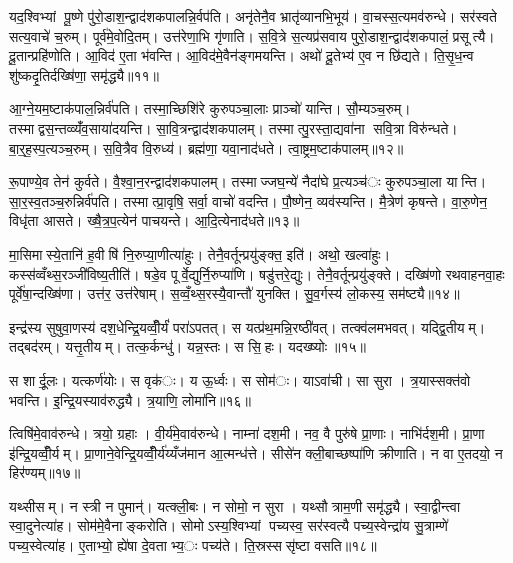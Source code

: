 यद॒श्विभ्यां पू॒ष्णे पु॑रो॒डाश॒न्द्वाद॑शकपालन्नि॒र्वप॑ति। अनृ॑तेनै॒व भ्रातृ॑व्यानभि॒भूय॑। वा॒चस्स॒त्यमव॑रुन्धे। सर॑स्वते सत्य॒वाचे॑ च॒रुम्। पूर्व॑मे॒वोदि॒तम्। उत्त॑रेणा॒भि गृ॑णाति। स॒वि॒त्रे स॒त्यप्र॑सवाय पुरो॒डाश॒न्द्वाद॑शकपालं॒ प्रसूत्यै। दू॒तान्प्रहि॑णोति। आ॒विद॑ ए॒ता भ॑वन्ति। आ॒विद॑मे॒वैन॑ङ्गमयन्ति। अथो॑ दू॒तेभ्य॑ ए॒व न छि॑द्यते। ति॒सृ॒ध॒न्व शु॑ष्कदृ॒तिर्दख्षि॑णा॒ समृ॑द्ध्यै॥११॥


आ॒ग्ने॒यम॒ष्टाक॑पाल॒न्निर्व॑पति। तस्मा॒च्छिशि॑रे कुरुपञ्चा॒लाः प्राञ्चो॑ यान्ति। सौ॒म्यञ्च॒रुम्। तस्माद्वस॒न्तव्व्यँ॑व॒साया॑दयन्ति। सा॒वि॒त्रन्द्वाद॑शकपालम्। तस्मात्पु॒रस्ता॒द्यवा॑ना सवि॒त्रा विरु॑न्धते। बा॒र्॒ह॒स्प॒त्यञ्च॒रुम्। स॒वि॒त्रैव वि॒रुध्य॑। ब्रह्म॑णा॒ यवा॒नाद॑धते। त्वा॒ष्ट्रम॒ष्टाक॑पालम्॥१२॥

रू॒पाण्ये॒व तेन॑ कुर्वते। वै॒श्वा॒न॒रन्द्वाद॑शकपालम्। तस्माज्जघ॒न्ये॑ नैदा॑घे प्र॒त्यञ्च॑ः कुरुपञ्चा॒ला यान्ति। सा॒र॒स्व॒तञ्च॒रुन्निर्व॑पति। तस्मात्प्रा॒वृषि॒ सर्वा॒ वाचो॑ वदन्ति। पौ॒ष्णेन॒ व्यव॑स्यन्ति। मै॒त्रेण॑ कृषन्ते। वा॒रु॒णेन॒ विधृ॑ता आसते। ख्षै॒त्र॒प॒त्येन॑ पाचयन्ते। आ॒दि॒त्येनाद॑धते॥१३॥

मा॒सिमास्ये॒तानि॑ ह॒वीषि॑ नि॒रुप्या॒णीत्या॑हुः। तेनै॒वर्तून्प्रयु॑ङ्क्त॒ इति॑। अथो॒ खल्वा॑हुः। कस्स॑व्वँथ्स॒रञ्जी॑विष्य॒तीति॑। षडे॒व पूर्वे॒द्युर्नि॒रुप्या॑णि। षडु॑त्तरे॒द्युः। तेनै॒वर्तून्प्रयु॑ङ्क्ते। दख्षि॑णो रथवाहनवा॒हः पूर्वे॑षा॒न्दख्षि॑णा। उत्त॑र॒ उत्त॑रेषाम्। स॒व्वँ॒थ्स॒रस्यै॒वान्तौ॑ युनक्ति। सु॒व॒र्गस्य॑ लो॒कस्य॒ सम॑ष्ट्यै॥१४॥


इन्द्र॑स्य सुषुवा॒णस्य॑ दश॒धेन्द्रि॒यव्वीँ॒र्यं॑ परा॑ऽपतत्। स यत्प्र॑थ॒मन्नि॒रष्ठी॑वत्। तत्क्व॑लमभवत्। यद्द्वि॒तीयम्। तद्बद॑रम्। यत्तृ॒तीयम्। तत्क॒र्कन्धु॑। यन्न॒स्तः। स सि॒हः। यदख्ष्योः॥१५॥

स शार्दू॒लः। यत्कर्ण॑योः। स वृक॑ः। य ऊ॒र्ध्वः। स सोम॑ः। याऽवा॑ची। सा सुरा। त्र॒यास्सक्त॑वो भवन्ति। इ॒न्द्रि॒यस्याव॑रुद्ध्यै। त्र॒याणि॒ लोमा॑नि॥१६॥

त्विषि॑मे॒वाव॑रुन्धे। त्रयो॒ ग्रहाः। वी॒र्य॑मे॒वाव॑रुन्धे। नाम्ना॑ दश॒मी। नव॒ वै पुरु॑षे प्रा॒णाः। नाभि॑र्दश॒मी। प्रा॒णा इ॑न्द्रि॒यव्वीँ॒र्यम्। प्रा॒णाने॒वेन्द्रि॒यव्वीँ॒र्य॑य्यँज॑मान आ॒त्मन्ध॑त्ते। सीसे॑न क्ली॒बाच्छष्पा॑णि क्रीणाति। न वा ए॒तदयो॒ न हिर॑ण्यम्॥१७॥

यथ्सीसम्। न स्त्री न पुमान्॑। यत्क्ली॒बः। न सोमो॒ न सुरा। यथ्सौत्राम॒णी समृ॑द्ध्यै। स्वा॒द्वीन्त्वा स्वा॒दुनेत्या॑ह। सोम॑मे॒वैनाङ्करोति। सोमोऽस्य॒श्विभ्यां पच्यस्व॒ सर॑स्वत्यै पच्य॒स्वेन्द्रा॑य सु॒त्राम्णे॑ पच्य॒स्वेत्या॑ह। ए॒ताभ्यो॒ ह्ये॑षा दे॒वताभ्य॒ः पच्य॑ते। ति॒स्रस्ससृ॑ष्टा वसति॥१८॥

